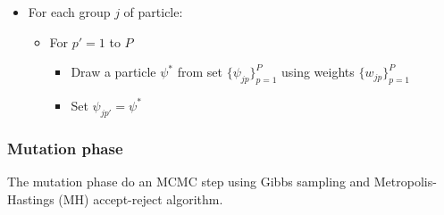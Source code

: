 \documentclass[12pt]{article}
\newcounter{thm}[section]
\begin{document}
\begin{itemize}
	\item For each group $j$ of particle:
	\begin{itemize}
		\item For $p'=1$ to $P$
		\begin{itemize}
			\item Draw a particle $\psi^*$ from set $\{\psi_{jp}\}_{p=1}^P$ using weights $\{w_{jp}\}_{p=1}^P$
			\item Set $\psi_{jp'} = \psi^*$
		\end{itemize}
	\end{itemize}
\end{itemize}

\subsubsection{Mutation phase}

The mutation phase do an MCMC step using Gibbs sampling and Metropolis-Hastings (MH) accept-reject algorithm.
\end{document}
